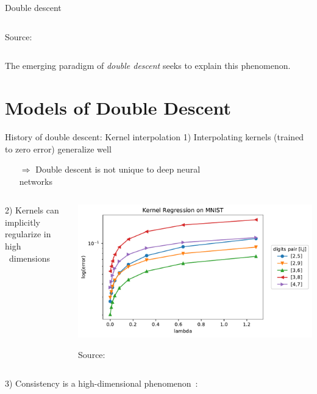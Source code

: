 \documentclass[10pt, aspectratio=169]{beamer}
\begin{document}
\begin{frame}[t]{Double descent}
\begin{columns}
\begin{column}{0.5\linewidth}
\begin{center}
\vspace{-0.2cm}
{\scriptsize Source: \citep{nakkiran2019deep}}
\end{center}
\end{column}
\end{columns}
\vspace{0.2cm}
The emerging paradigm of \emph{double descent} seeks to explain this phenomenon.
\end{frame}
%
\section{Models of Double Descent}
\begin{frame}{History of double descent: Kernel interpolation}
1) Interpolating kernels (trained to zero error) generalize well~\citep{belkin2018understand}
\begin{itemize}
    \item[$\Rightarrow$] Double descent is not unique to deep neural\\ networks
\end{itemize}
\pause
\begin{columns}
\begin{column}{0.5\linewidth}
\hspace{0.4cm}2) Kernels can implicitly regularize in high\\\qquad\, dimensions~\citep{liang2020just}
\end{column}
\begin{column}{0.5\linewidth}
\begin{center}
\vspace{-0.6cm}
\hspace{1cm}\includegraphics[width=0.8\linewidth]{part-4-images/mnist-intro.pdf}

\vspace{-0.2cm}
\hspace{1.5cm}
{\scriptsize Source: \citep{liang2020just}}
\end{center}
\end{column}
\end{columns}
\pause
3) Consistency is a high-dimensional phenomenon~\citep{rakhlin2019consistency}:


\end{frame}
\end{document}
